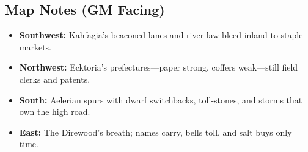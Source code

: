 \subsection*{Map Notes (GM Facing)}
\begin{itemize}
  \item \textbf{Southwest:} Kahfagia’s beaconed lanes and river-law bleed inland to staple markets.  
  \item \textbf{Northwest:} Ecktoria’s prefectures—paper strong, coffers weak—still field clerks and patents.  
  \item \textbf{South:} Aelerian spurs with dwarf switchbacks, toll-stones, and storms that own the high road.  
  \item \textbf{East:} The Direwood’s breath; names carry, bells toll, and salt buys only time.  
\end{itemize}